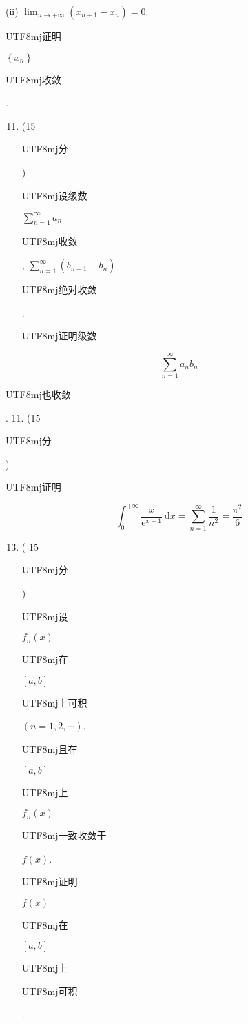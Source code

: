 \documentclass[10pt]{article}
\begin{document}
(ii) $\lim _{n \rightarrow+\infty}\left(x_{n+1}-x_{n}\right)=0$.

\begin{CJK}{UTF8}{mj}证明\end{CJK} $\left\{x_{n}\right\}$ \begin{CJK}{UTF8}{mj}收敛\end{CJK}.

\begin{enumerate}
  \setcounter{enumi}{10}
  \item (15 \begin{CJK}{UTF8}{mj}分\end{CJK}) \begin{CJK}{UTF8}{mj}设级数\end{CJK} $\sum_{n=1}^{\infty} a_{n}$ \begin{CJK}{UTF8}{mj}收敛\end{CJK}, $\sum_{n=1}^{\infty}\left(b_{n+1}-b_{n}\right)$ \begin{CJK}{UTF8}{mj}绝对收敛\end{CJK}. \begin{CJK}{UTF8}{mj}证明级数\end{CJK}
\end{enumerate}
$$
\sum_{n=1}^{\infty} a_{n} b_{n}
$$
\begin{CJK}{UTF8}{mj}也收敛\end{CJK}. 11. (15 \begin{CJK}{UTF8}{mj}分\end{CJK}) \begin{CJK}{UTF8}{mj}证明\end{CJK}
$$
\int_{0}^{+\infty} \frac{x}{\mathrm{e}^{x-1}} \mathrm{~d} x=\sum_{n=1}^{\infty} \frac{1}{n^{2}}=\frac{\pi^{2}}{6}
$$

\begin{enumerate}
  \setcounter{enumi}{12}
  \item ( 15 \begin{CJK}{UTF8}{mj}分\end{CJK}) \begin{CJK}{UTF8}{mj}设\end{CJK} $f_{n}(x)$ \begin{CJK}{UTF8}{mj}在\end{CJK} $[a, b]$ \begin{CJK}{UTF8}{mj}上可积\end{CJK} $(n=1,2, \cdots)$, \begin{CJK}{UTF8}{mj}且在\end{CJK} $[a, b]$ \begin{CJK}{UTF8}{mj}上\end{CJK} $f_{n}(x)$ \begin{CJK}{UTF8}{mj}一致收敛于\end{CJK} $f(x)$. \begin{CJK}{UTF8}{mj}证明\end{CJK} $f(x)$ \begin{CJK}{UTF8}{mj}在\end{CJK} $[a, b]$ \begin{CJK}{UTF8}{mj}上\end{CJK} \begin{CJK}{UTF8}{mj}可积\end{CJK}.
\end{enumerate}
\end{document}
